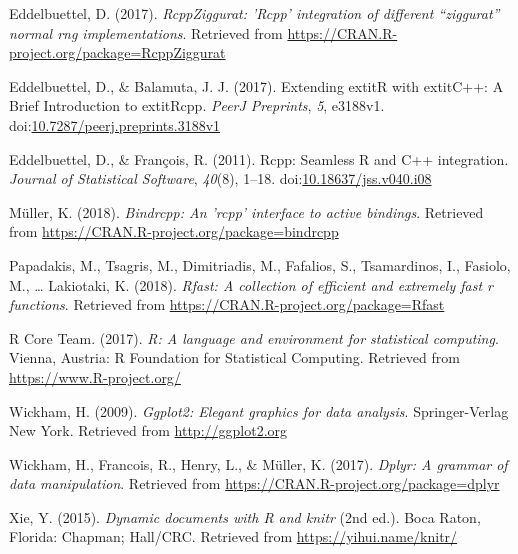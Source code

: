 \documentclass[man]{apa6}
\theoremstyle{definition}
\theoremstyle{definition}
\theoremstyle{definition}
\theoremstyle{remark}
\begin{document}
\hypertarget{ref-R-RcppZiggurat}{}
Eddelbuettel, D. (2017). \emph{RcppZiggurat: 'Rcpp' integration of
different ``ziggurat'' normal rng implementations}. Retrieved from
\url{https://CRAN.R-project.org/package=RcppZiggurat}

\hypertarget{ref-R-Rcpp_b}{}
Eddelbuettel, D., \& Balamuta, J. J. (2017). Extending extitR with
extitC++: A Brief Introduction to extitRcpp. \emph{PeerJ Preprints},
\emph{5}, e3188v1.
doi:\href{https://doi.org/10.7287/peerj.preprints.3188v1}{10.7287/peerj.preprints.3188v1}

\hypertarget{ref-R-Rcpp_a}{}
Eddelbuettel, D., \& François, R. (2011). Rcpp: Seamless R and C++
integration. \emph{Journal of Statistical Software}, \emph{40}(8),
1--18.
doi:\href{https://doi.org/10.18637/jss.v040.i08}{10.18637/jss.v040.i08}

\hypertarget{ref-R-bindrcpp}{}
Müller, K. (2018). \emph{Bindrcpp: An 'rcpp' interface to active
bindings}. Retrieved from
\url{https://CRAN.R-project.org/package=bindrcpp}

\hypertarget{ref-R-Rfast}{}
Papadakis, M., Tsagris, M., Dimitriadis, M., Fafalios, S., Tsamardinos,
I., Fasiolo, M., \ldots{} Lakiotaki, K. (2018). \emph{Rfast: A
collection of efficient and extremely fast r functions}. Retrieved from
\url{https://CRAN.R-project.org/package=Rfast}

\hypertarget{ref-R-base}{}
R Core Team. (2017). \emph{R: A language and environment for statistical
computing}. Vienna, Austria: R Foundation for Statistical Computing.
Retrieved from \url{https://www.R-project.org/}

\hypertarget{ref-R-ggplot2}{}
Wickham, H. (2009). \emph{Ggplot2: Elegant graphics for data analysis}.
Springer-Verlag New York. Retrieved from \url{http://ggplot2.org}

\hypertarget{ref-R-dplyr}{}
Wickham, H., Francois, R., Henry, L., \& Müller, K. (2017). \emph{Dplyr:
A grammar of data manipulation}. Retrieved from
\url{https://CRAN.R-project.org/package=dplyr}

\hypertarget{ref-R-knitr}{}
Xie, Y. (2015). \emph{Dynamic documents with R and knitr} (2nd ed.).
Boca Raton, Florida: Chapman; Hall/CRC. Retrieved from
\url{https://yihui.name/knitr/}

\endgroup
\end{document}
